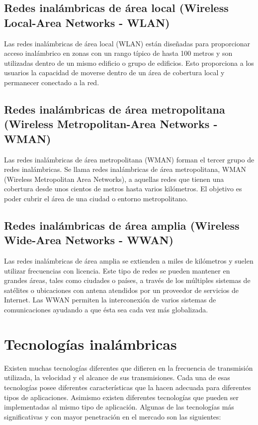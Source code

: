 	\subsection{Redes inalámbricas de área local (Wireless Local-Area Networks - WLAN)}
	Las redes inalámbricas de área local (WLAN) están diseñadas para proporcionar acceso inalámbrico en zonas con un rango típico de hasta 100 metros y son utilizadas dentro de un mismo edificio o grupo de edificios. Esto proporciona a los usuarios la capacidad de moverse dentro de un área de cobertura local y permanecer conectado a la red. \cite{salazarRedes}
	
	\subsection{Redes inalámbricas de área metropolitana (Wireless Metropolitan-Area Networks - WMAN)}
	Las redes inalámbricas de área metropolitana (WMAN) forman el tercer grupo de redes inalámbricas. Se llama redes inalámbricas de área metropolitana, WMAN (Wireless Metropolitan Area Networks), a aquellas redes que tienen una cobertura desde unos cientos de metros hasta varios kilómetros. El objetivo es poder cubrir el área de una ciudad o entorno metropolitano. \cite{salazarRedes} \cite{yunqyeraWiFi}
	
	\subsection{Redes inalámbricas de área amplia (Wireless Wide-Area Networks - WWAN)}
	Las redes inalámbricas de área amplia se extienden a miles de kilómetros y suelen utilizar frecuencias con licencia. Este tipo de redes se pueden mantener en grandes áreas, tales como ciudades o países, a través de los múltiples sistemas de satélites o ubicaciones con antena atendidos por un proveedor de servicios de Internet. Las WWAN permiten la interconexión de varios sistemas de comunicaciones ayudando a que ésta sea cada vez más globalizada. \cite{salazarRedes}

	\section{Tecnologías inalámbricas}
	Existen muchas tecnologías diferentes que difieren en la frecuencia de transmisión utilizada, la velocidad y el alcance de sus transmisiones. Cada una de esas tecnologías posee diferentes características que la hacen adecuada para diferentes tipos de aplicaciones. Asimismo existen diferentes tecnologías que pueden ser implementadas al mismo tipo de aplicación. Algunas de las tecnologías más significativas y con mayor penetración en el mercado son las siguientes:
	
